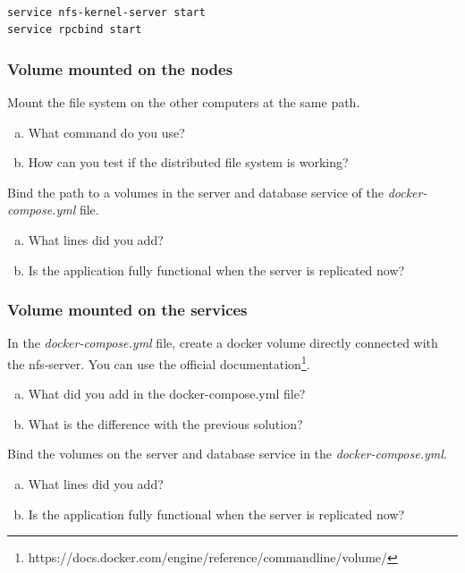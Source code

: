 \documentclass[a4paper,11pt]{exam}
\begin{document}
\begin{lstlisting}[frame=single,language={sh}]  % Start your code-block

service nfs-kernel-server start	
service rpcbind start			

\end{lstlisting}

\subsubsection{Volume mounted on the nodes}

\begin{questions}
	\question Mount the file system on the other computers at the same path.
	\begin{enumerate}[(a)]
		\item What command do you use?
		\item How can you test if the distributed file system is working?
	\end{enumerate}
	\question Bind the path to a volumes in the server and database service of the \textit{docker-compose.yml} file.
	\begin{enumerate}[(a)]
		\item What lines did you add?
		\item Is the application fully functional when the server is replicated now?
	\end{enumerate}
\end{questions}

\subsubsection{Volume mounted on the services}

\begin{questions}
	\question In the \textit{docker-compose.yml} file, create a docker volume directly connected with the nfs-server. 
You can use the official documentation\footnote{https://docs.docker.com/engine/reference/commandline/volume/}.
	\begin{enumerate}[(a)]
		\item What did you add in the docker-compose.yml file?
		\item What is the difference with the previous solution?
	\end{enumerate}
	\question Bind the volumes on the server and database service in the \textit{docker-compose.yml}.
	\begin{enumerate}[(a)]
		\item What lines did you add?
		\item Is the application fully functional when the server is replicated now?
	\end{enumerate}
\end{questions}
\end{document}
